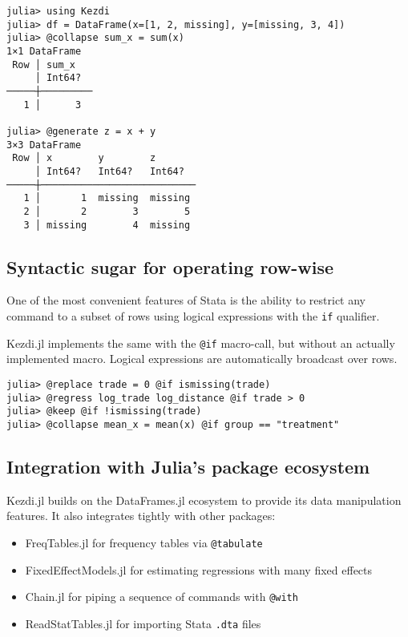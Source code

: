 \documentclass{juliacon}
\begin{document}
\begin{verbatim}
julia> using Kezdi
julia> df = DataFrame(x=[1, 2, missing], y=[missing, 3, 4])
julia> @collapse sum_x = sum(x)
1×1 DataFrame
 Row │ sum_x   
     │ Int64?  
─────┼─────────
   1 │      3

julia> @generate z = x + y
3×3 DataFrame
 Row │ x        y        z
     │ Int64?   Int64?   Int64?
─────┼───────────────────────────
   1 │       1  missing  missing
   2 │       2        3        5
   3 │ missing        4  missing
\end{verbatim}

\subsection{Syntactic sugar for operating row-wise}

One of the most convenient features of Stata is the ability to restrict any command to a subset of rows using logical expressions with the \texttt{if} qualifier.

Kezdi.jl implements the same with the \texttt{@if} macro-call, but without an actually implemented macro. Logical expressions are automatically broadcast over rows.

\begin{verbatim}
julia> @replace trade = 0 @if ismissing(trade)
julia> @regress log_trade log_distance @if trade > 0
julia> @keep @if !ismissing(trade) 
julia> @collapse mean_x = mean(x) @if group == "treatment"
\end{verbatim}

\subsection{Integration with Julia's package ecosystem}

Kezdi.jl builds on the DataFrames.jl ecosystem \citep{DataFrame.jl2023} to provide its data manipulation features. It also integrates tightly with other packages:

\begin{itemize}
	\item FreqTables.jl \citep{FreqTables.jl2023} for frequency tables via \texttt{@tabulate}
	\item FixedEffectModels.jl \citep{FixedEffectModels.jl2023} for estimating regressions with many fixed effects
	\item Chain.jl for piping a sequence of commands with \texttt{@with}
	\item ReadStatTables.jl for importing Stata \texttt{.dta} files
\end{itemize}
\end{document}
